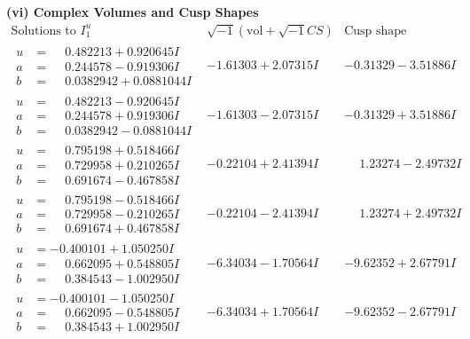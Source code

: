 \documentclass[1p]{elsarticle_modified}
\theoremstyle{definition}
\newcommand{\I}{\sqrt{-1}}
\begin{document}
\newpage\flushleft \textbf{(vi) Complex Volumes and Cusp Shapes}
$$\begin{array}{c|c|c}  
\text{Solutions to }I^u_{1}& \I (\text{vol} + \sqrt{-1}CS) & \text{Cusp shape}\\
 \hline 
\begin{aligned}
u &= \phantom{-}0.482213 + 0.920645 I \\
a &= \phantom{-}0.244578 - 0.919306 I \\
b &= \phantom{-}0.0382942 + 0.0881044 I\end{aligned}
 & -1.61303 + 2.07315 I & -0.31329 - 3.51886 I \\ \hline\begin{aligned}
u &= \phantom{-}0.482213 - 0.920645 I \\
a &= \phantom{-}0.244578 + 0.919306 I \\
b &= \phantom{-}0.0382942 - 0.0881044 I\end{aligned}
 & -1.61303 - 2.07315 I & -0.31329 + 3.51886 I \\ \hline\begin{aligned}
u &= \phantom{-}0.795198 + 0.518466 I \\
a &= \phantom{-}0.729958 + 0.210265 I \\
b &= \phantom{-}0.691674 - 0.467858 I\end{aligned}
 & -0.22104 + 2.41394 I & \phantom{-}1.23274 - 2.49732 I \\ \hline\begin{aligned}
u &= \phantom{-}0.795198 - 0.518466 I \\
a &= \phantom{-}0.729958 - 0.210265 I \\
b &= \phantom{-}0.691674 + 0.467858 I\end{aligned}
 & -0.22104 - 2.41394 I & \phantom{-}1.23274 + 2.49732 I \\ \hline\begin{aligned}
u &= -0.400101 + 1.050250 I \\
a &= \phantom{-}0.662095 + 0.548805 I \\
b &= \phantom{-}0.384543 - 1.002950 I\end{aligned}
 & -6.34034 - 1.70564 I & -9.62352 + 2.67791 I \\ \hline\begin{aligned}
u &= -0.400101 - 1.050250 I \\
a &= \phantom{-}0.662095 - 0.548805 I \\
b &= \phantom{-}0.384543 + 1.002950 I\end{aligned}
 & -6.34034 + 1.70564 I & -9.62352 - 2.67791 I \\ \hline\begin{aligned}

\end{aligned}
\end{array}$$
\end{document}
